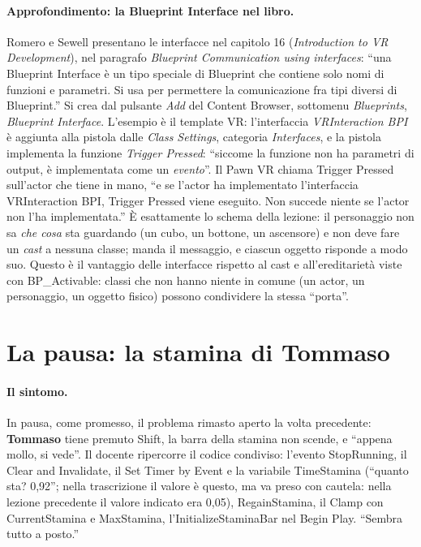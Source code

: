 \paragraph{Approfondimento: la Blueprint Interface nel libro.} Romero e Sewell presentano le
interfacce nel capitolo 16 (\emph{Introduction to VR Development}), nel paragrafo
\emph{Blueprint Communication using interfaces}: ``una Blueprint Interface è un tipo speciale
di Blueprint che contiene solo nomi di funzioni e parametri. Si usa per permettere la
comunicazione fra tipi diversi di Blueprint.'' Si crea dal pulsante \emph{Add} del Content
Browser, sottomenu \emph{Blueprints}, \emph{Blueprint Interface}. L'esempio è il template VR:
l'interfaccia \emph{VRInteraction BPI} è aggiunta alla pistola dalle \emph{Class Settings},
categoria \emph{Interfaces}, e la pistola implementa la funzione \emph{Trigger Pressed}:
``siccome la funzione non ha parametri di output, è implementata come un \emph{evento}''. Il
Pawn VR chiama Trigger Pressed sull'actor che tiene in mano, ``e se l'actor ha implementato
l'interfaccia VRInteraction BPI, Trigger Pressed viene eseguito. Non succede niente se l'actor
non l'ha implementata.'' È esattamente lo schema della lezione: il personaggio non sa
\emph{che cosa} sta guardando (un cubo, un bottone, un ascensore) e non deve fare un
\emph{cast} a nessuna classe; manda il messaggio, e ciascun oggetto risponde a modo suo.
Questo è il vantaggio delle interfacce rispetto al cast e all'ereditarietà viste con
BP\_Activable: classi che non hanno niente in comune (un actor, un personaggio, un oggetto
fisico) possono condividere la stessa ``porta''.

\section{La pausa: la stamina di Tommaso}
\label{ue12:sec:pausa}

\paragraph{Il sintomo.} In pausa, come promesso, il problema rimasto aperto la volta
precedente: \textbf{Tommaso} tiene premuto Shift, la barra della stamina non scende, e
``appena mollo, si vede''. Il docente ripercorre il codice condiviso: l'evento StopRunning,
il Clear and Invalidate, il Set Timer by Event e la variabile TimeStamina (``quanto sta?
0,92''; nella trascrizione il valore è questo, ma va preso con cautela: nella lezione
precedente il valore indicato era 0,05), RegainStamina, il Clamp con CurrentStamina e
MaxStamina, l'InitializeStaminaBar nel Begin Play. ``Sembra tutto a posto.''

